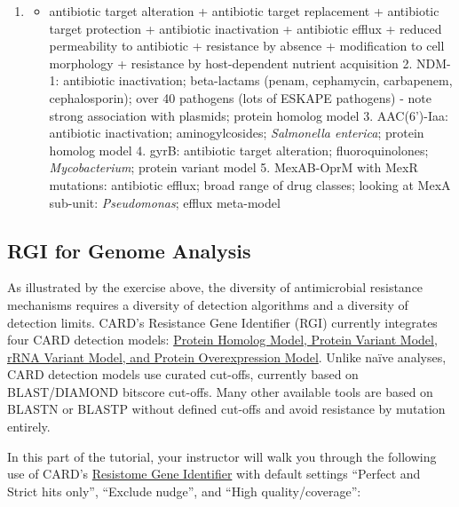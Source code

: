\documentclass[
]{book}
\providecommand{\tightlist}{%
  \setlength{\itemsep}{0pt}\setlength{\parskip}{0pt}}
\begin{document}
\begin{enumerate}
\def\labelenumi{\arabic{enumi}.}
\tightlist
\item
  \begin{itemize}
  \tightlist
  \item
    antibiotic target alteration + antibiotic target replacement + antibiotic target protection + antibiotic inactivation + antibiotic efflux + reduced permeability to antibiotic + resistance by absence + modification to cell morphology + resistance by host-dependent nutrient acquisition 2. NDM-1: antibiotic inactivation; beta-lactams (penam, cephamycin, carbapenem, cephalosporin); over 40 pathogens (lots of ESKAPE pathogens) - note strong association with plasmids; protein homolog model 3. AAC(6')-Iaa: antibiotic inactivation; aminogylcosides; \emph{Salmonella enterica}; protein homolog model 4. gyrB: antibiotic target alteration; fluoroquinolones; \emph{Mycobacterium}; protein variant model 5. MexAB-OprM with MexR mutations: antibiotic efflux; broad range of drug classes; looking at MexA sub-unit: \emph{Pseudomonas}; efflux meta-model
  \end{itemize}
\end{enumerate}

\subsection{RGI for Genome Analysis}\label{rgi-for-genome-analysis}

As illustrated by the exercise above, the diversity of antimicrobial resistance mechanisms requires a diversity of detection algorithms and a diversity of detection limits. CARD's Resistance Gene Identifier (RGI) currently integrates four CARD detection models: \href{https://github.com/arpcard/rgi\#analyzing-genomes-genome-assemblies-metagenomic-contigs-or-proteomes-a-k-a-rgi-main}{Protein Homolog Model, Protein Variant Model, rRNA Variant Model, and Protein Overexpression Model}. Unlike naïve analyses, CARD detection models use curated cut-offs, currently based on BLAST/DIAMOND bitscore cut-offs. Many other available tools are based on BLASTN or BLASTP without defined cut-offs and avoid resistance by mutation entirely.

In this part of the tutorial, your instructor will walk you through the following use of CARD's \href{https://card.mcmaster.ca/analyze/rgi}{Resistome Gene Identifier} with default settings ``Perfect and Strict hits only'', ``Exclude nudge'', and ``High quality/coverage'':
\end{document}
